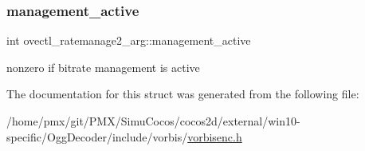 \subsubsection{\texorpdfstring{management\+\_\+active}{management\_active}}
{\footnotesize\ttfamily int ovectl\+\_\+ratemanage2\+\_\+arg\+::management\+\_\+active}

nonzero if bitrate management is active 

The documentation for this struct was generated from the following file\+:\begin{DoxyCompactItemize}
\item 
/home/pmx/git/\+P\+M\+X/\+Simu\+Cocos/cocos2d/external/win10-\/specific/\+Ogg\+Decoder/include/vorbis/\hyperlink{cocos2d_2external_2win10-specific_2OggDecoder_2include_2vorbis_2vorbisenc_8h}{vorbisenc.\+h}\end{DoxyCompactItemize}
